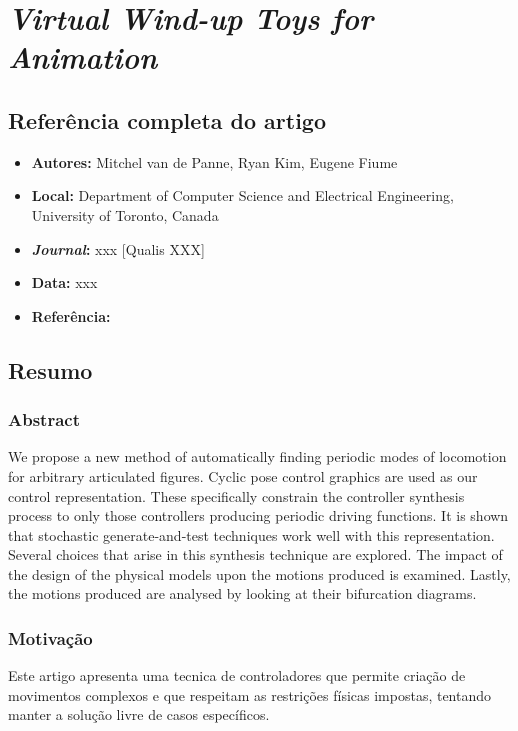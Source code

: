 \section{\textit{Virtual Wind-up Toys for Animation}}

\subsection{Referência completa do artigo}

\begin{itemize}
  \item \textbf{Autores:} Mitchel van de Panne, Ryan Kim, Eugene Fiume
  \item \textbf{Local:} Department of Computer Science and Electrical Engineering, University of Toronto, Canada
  \item \textbf{\textit{Journal}:} xxx [Qualis XXX]
  \item \textbf{Data:} xxx
  \item \textbf{Referência:} 
\end{itemize}


\subsection{Resumo}
\subsubsection{Abstract}
We propose a new method of automatically finding periodic modes of locomotion for arbitrary articulated figures. Cyclic pose control graphics are used as our control representation. These specifically constrain the controller synthesis process to only those controllers producing periodic driving functions. It is shown that stochastic generate-and-test techniques work well with this representation. Several choices that arise in this synthesis technique are explored. The impact of the design of the physical models upon the motions produced is examined. Lastly, the motions produced are analysed by looking at their bifurcation diagrams.
\subsubsection{Motivação}
Este artigo apresenta uma tecnica de controladores que permite criação de movimentos complexos e que respeitam as restrições físicas impostas, tentando manter a solução livre de casos específicos.
